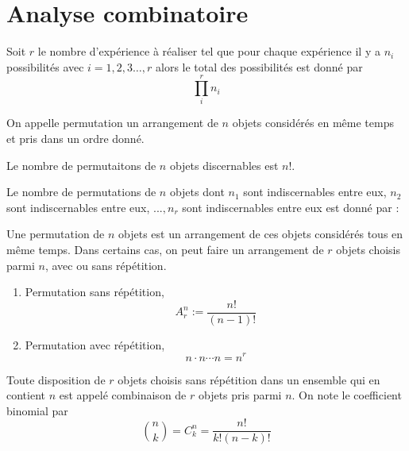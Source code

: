 \section[Chapitre 1]{Analyse combinatoire}
	\begin{mythm}
		Soit $r$ le nombre d'expérience à réaliser tel que pour chaque expérience il y a $n_i$ possibilités avec $i=1,2,3\dots,r$ alors le total des possibilités est donné par
		\begin{equation}\label{prop:prodprinciple}
			\prod_i^r n_i
		\end{equation}%
	\end{mythm}%
	\begin{mydef}[Permutation]
		On appelle permutation un arrangement de $n$ objets considérés en même
		temps et pris dans un ordre donné.
	\end{mydef}%
	\begin{mythm}
		 Le nombre de permutaitons de $n$ objets discernables est $n!$.
	\end{mythm}%
	\begin{mythm}
		Le nombre de permutations de $n$ objets dont $n_1$ sont indiscernables entre eux, $n_2$ sont indiscernables entre eux, $..., n_r$ sont indiscernables entre eux est donné par :
		\begin{remark}
			Une permutation de $n$ objets est un arrangement de ces objets considérés tous en même temps. Dans certains cas, on peut faire un arrangement de $r$ objets choisis parmi $n$, avec ou	sans répétition.
			\begin{enumerate}
				\item Permutation sans répétition,\[A_r^n:=\frac{n!}{(n-1)!}\]
				\item Permutation avec répétition, \[n\cdot n\cdots n=n^r\]
			\end{enumerate}%
		\end{remark}%
	\end{mythm}%
	\begin{mydef}
		Toute disposition de $r$ objets choisis sans répétition dans un ensemble qui en
		contient $n$ est appelé combinaison de $r$ objets pris parmi $n$. On note le coefficient binomial par
		\begin{equation}\label{def:coefbinomial}
			\binom{n}{k}=C_k^n=\frac{n!}{k!(n-k)!}
		\end{equation}%
	\end{mydef}%
